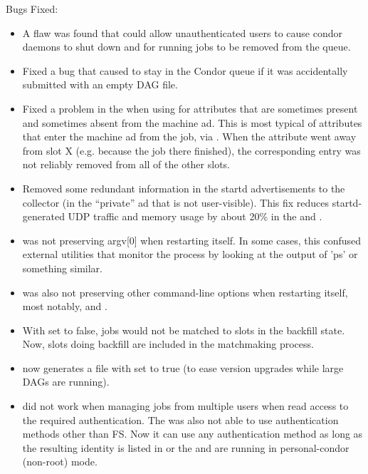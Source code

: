 \noindent Bugs Fixed:

\begin{itemize}

\item \Security A flaw was found that could allow unauthenticated users to
cause condor daemons to shut down and for running jobs to be removed from
the queue.

\item Fixed a bug that caused  to stay in the Condor
queue if it was accidentally submitted with an empty DAG file.

\item Fixed a problem in the  when using
 for attributes that are sometimes
present and sometimes absent from the machine ad.  This is most
typical of attributes that enter the machine ad from the job, via
.  When the attribute went away from slot
X (e.g. because the job there finished), the corresponding
 entry was not reliably removed from
all of the other slots.

\item Removed some redundant information in the startd advertisements
to the collector (in the ``private'' ad that is not user-visible).
This fix reduces startd-generated UDP traffic and memory usage by
about 20\% in the  and .

\item {} was not preserving argv[0] when restarting
itself.  In some cases, this confused external utilities that monitor
the  process by looking at the output of 'ps' or
something similar.

\item {} was also not preserving other command-line options
when restarting itself, most notably,  and .

\item With  set to false, jobs
would not be matched to slots in the backfill state.  Now, slots doing
backfill are included in the matchmaking process.

\item {} now generates a  file with
 set to true (to ease version upgrades while
large DAGs are running).

\item {} did not work when managing jobs from
multiple users when read access to the  required
authentication.  The  was also not able to use
authentication methods other than FS.  Now it can use any
authentication method as long as the resulting identity is listed in
 or the  and
 are running in personal-condor (non-root) mode.

\end{itemize}

